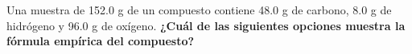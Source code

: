 Una muestra de 152.0 g de un compuesto contiene 48.0 g de carbono, 8.0 g de hidrógeno y 96.0 g de oxígeno.
\textbf{¿Cuál de las siguientes opciones muestra la fórmula empírica del compuesto?}

\begin{oneparchoices}
    \choice  {}
    \choice  {}
    \choice  {}
    \choice  {}
\end{oneparchoices}